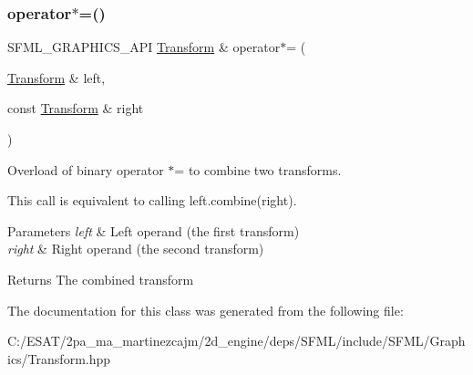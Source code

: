 \subsubsection{\texorpdfstring{operator$\ast$=()}{operator*=()}}
{\footnotesize\ttfamily S\+F\+M\+L\+\_\+\+G\+R\+A\+P\+H\+I\+C\+S\+\_\+\+A\+PI \hyperlink{classsf_1_1_transform}{Transform} \& operator$\ast$= (\begin{DoxyParamCaption}\item[{\hyperlink{classsf_1_1_transform}{Transform} \&}]{left,  }\item[{const \hyperlink{classsf_1_1_transform}{Transform} \&}]{right }\end{DoxyParamCaption})\hspace{0.3cm}{\ttfamily [related]}}



Overload of binary operator $\ast$= to combine two transforms. 

This call is equivalent to calling left.\+combine(right).


\begin{DoxyParams}{Parameters}
{\em left} & Left operand (the first transform) \\
\hline
{\em right} & Right operand (the second transform)\\
\hline
\end{DoxyParams}
\begin{DoxyReturn}{Returns}
The combined transform 
\end{DoxyReturn}


The documentation for this class was generated from the following file\+:\begin{DoxyCompactItemize}
\item 
C\+:/\+E\+S\+A\+T/2pa\+\_\+ma\+\_\+martinezcajm/2d\+\_\+engine/deps/\+S\+F\+M\+L/include/\+S\+F\+M\+L/\+Graphics/Transform.\+hpp\end{DoxyCompactItemize}
